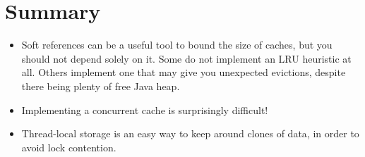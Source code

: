 \section{Summary}

\begin{itemize}
  \item Soft references can be a useful tool to bound the size of caches, but
  you should not depend solely on it. Some \jres do not implement an LRU
  heuristic at all. Others implement one that may give you unexpected
  evictions, despite there being plenty of free Java heap.
  \item Implementing a concurrent cache is surprisingly difficult!
  \item Thread-local storage is an easy way to keep around clones of data, in
  order to avoid lock contention.
\end{itemize}




